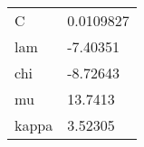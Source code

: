 \begin{tabular}{ll}
C     & 0.0109827 \\
lam   & -7.40351 \\
chi   & -8.72643 \\
mu    & 13.7413 \\
kappa & 3.52305 \\
\end{tabular}
